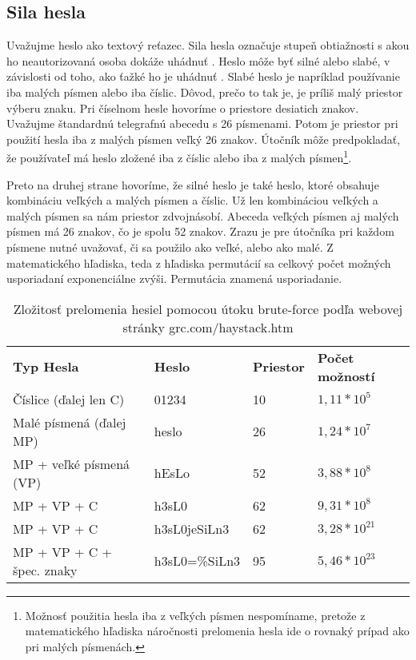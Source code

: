 \subsection{Sila hesla} 
\label{silahesla}
Uvažujme heslo ako textový reťazec. Sila hesla označuje stupeň obtiažnosti s akou ho neautorizovaná osoba dokáže uhádnuť \cite{sila_hesla}. Heslo môže byť silné alebo slabé, v závislosti od toho, ako ťažké ho je uhádnuť \cite{sila_hesla}. Slabé heslo je napríklad používanie iba malých písmen alebo iba číslic. Dôvod, prečo to tak je, je príliš malý priestor výberu znaku. Pri číselnom hesle hovoríme o priestore desiatich znakov. Uvažujme štandardnú telegrafnú abecedu s 26 písmenami. Potom je priestor pri použití hesla iba z malých písmen veľký 26 znakov. Útočník môže predpokladať, že používateľ má heslo zložené iba z číslic alebo iba z malých písmen\footnote{Možnosť použitia hesla iba z veľkých písmen nespomíname, pretože z matematického hľadiska náročnosti prelomenia hesla ide o rovnaký prípad ako pri malých písmenách.}.

Preto na druhej strane hovoríme, že silné heslo je také heslo, ktoré obsahuje kombináciu veľkých a malých písmen a číslic. Už len kombináciou veľkých a malých písmen sa nám priestor zdvojnásobí. Abeceda veľkých písmen aj malých písmen má 26 znakov, čo je spolu 52 znakov. Zrazu je pre útočníka pri každom písmene nutné uvažovať, či sa použilo ako veľké, alebo ako malé. Z matematického hľadiska, teda z hľadiska permutácií sa celkový počet možných usporiadaní exponenciálne zvýši. Permutácia znamená usporiadanie.  


\begin{table}[ht]
\caption{Zložitosť prelomenia hesiel pomocou útoku brute-force podľa webovej stránky grc.com/haystack.htm}
\label{table:1}
\begin{tabular}{llll}
\textbf{Typ Hesla}        & \textbf{Heslo} & \textbf{Priestor} & \textbf{Počet možností} \\
Číslice (ďalej len C)     & 01234          & 10                & $1,11*10^5$             \\
Malé písmená (ďalej MP)   & heslo          & 26                & $1,24*10^7$             \\
MP + veľké písmená (VP)   & hEsLo          & 52                & $3,88*10^8$             \\
MP + VP + C               & h3sL0          & 62                & $9,31*10^8$             \\
MP + VP + C				  & h3sL0jeSiLn3   & 62				   & $3,28*10^{21}$			 \\
MP + VP + C + špec. znaky & h3sL0=\%SiLn3  & 95                & $5,46*10^{23}$           
\end{tabular}
\end{table}

